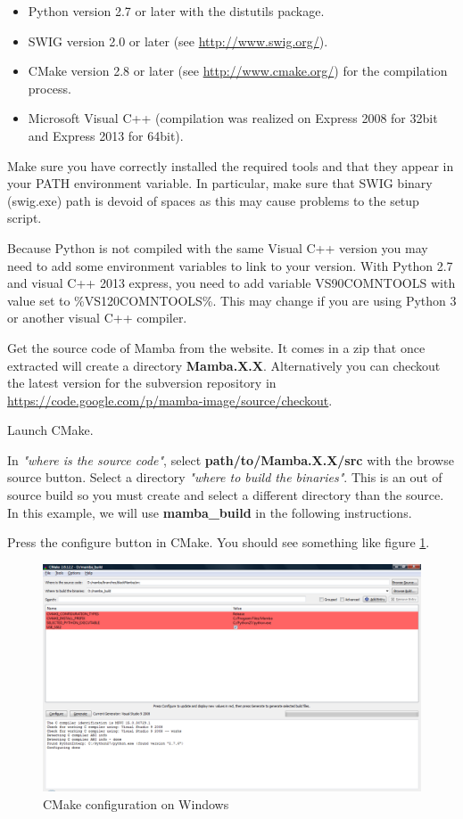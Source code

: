 \documentclass[a4paper,10pt,oneside]{article}
\begin{document}
\begin{itemize}
\item Python version 2.7 or later with the distutils package.
\item SWIG version 2.0 or later (see \url{http://www.swig.org/}).
\item CMake version 2.8 or later (see \url{http://www.cmake.org/}) for the 
compilation process.
\item Microsoft Visual C++ (compilation was realized on Express 2008 for 32bit
and Express 2013 for 64bit).
\end{itemize}

Make sure you have correctly installed the required tools and that they appear
in your PATH environment variable. In particular, make sure that SWIG binary
(swig.exe) path is devoid of spaces as this may cause problems to the setup
script.

Because Python is not compiled with the same Visual C++ version you may need
to add some environment variables to link to your version. With Python 2.7
and visual C++ 2013 express, you need to add variable VS90COMNTOOLS with
value set to \%VS120COMNTOOLS\%. This may change if you are using Python 3 or
another visual C++ compiler.

Get the source code of Mamba from the website. It comes in a zip that once
extracted will create a directory \textbf{Mamba.X.X}. Alternatively you can
checkout the latest version for the subversion repository in 
\url{https://code.google.com/p/mamba-image/source/checkout}.

Launch CMake.

In \textit{"where is the source code"}, select \textbf{path/to/Mamba.X.X/src} with
the browse source button. Select a directory \textit{"where to build the binaries"}.
This is an out of source build so you must create and select a different
directory than the source. In this example, we will use
\textbf{mamba\_build} in the following instructions.

Press the configure button in CMake. You should see something like
figure \ref{fig:cmake_win}.

\begin{figure}
\centering
\includegraphics[scale=0.3]{images/cmake_win.png}
\caption{CMake configuration on Windows}
\label{fig:cmake_win}
\end{figure}
\end{document}
